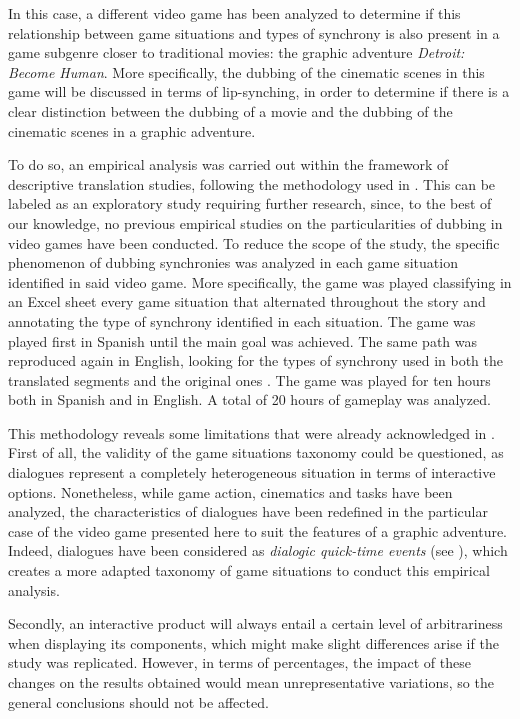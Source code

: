 \documentclass[output=paper]{langsci/langscibook}
\begin{document}
In this case, a different video game has been analyzed to determine if this relationship between game situations and types of synchrony is also present in a game subgenre closer to traditional movies: the graphic adventure \textit{Detroit: Become Human}. More specifically, the dubbing of the cinematic scenes in this game will be discussed in terms of lip-synching, in order to determine if there is a clear distinction between the dubbing of a movie and the dubbing of the cinematic scenes in a graphic adventure.

To do so, an empirical analysis was carried out within the framework of descriptive translation studies, following the methodology used in \textcites{mejias17}{mejias19}. This can be labeled as an exploratory study requiring further research, since, to the best of our knowledge, no previous empirical studies on the particularities of dubbing in video games have been conducted. To reduce the scope of the study, the specific phenomenon of dubbing synchronies was analyzed in each game situation identified in said video game. More specifically, the game was played classifying in an Excel sheet every game situation that alternated throughout the story and annotating the type of synchrony identified in each situation. The game was played first in Spanish until the main goal was achieved. The same path was reproduced again in English, looking for the types of synchrony used in both the translated segments and the original ones \parencite{toury95}. The game was played for ten hours both in Spanish and in English. A total of 20 hours of gameplay was analyzed.

This methodology reveals some limitations that were already acknowledged in \textcite[315--317]{mejias19}. First of all, the validity of the game situations taxonomy could be questioned, as dialogues represent a completely heterogeneous situation in terms of interactive options. Nonetheless, while game action, cinematics and tasks have been analyzed, the characteristics of dialogues have been redefined in the particular case of the video game presented here to suit the features of a graphic adventure. Indeed, dialogues have been considered as \emph{dialogic quick-time events} (see ), which creates a more adapted taxonomy of game situations to conduct this empirical analysis.

Secondly, an interactive product will always entail a certain level of arbitrariness when displaying its components, which might make slight differences arise if the study was replicated. However, in terms of percentages, the impact of these changes on the results obtained would mean unrepresentative variations, so the general conclusions should not be affected.
\end{document}
